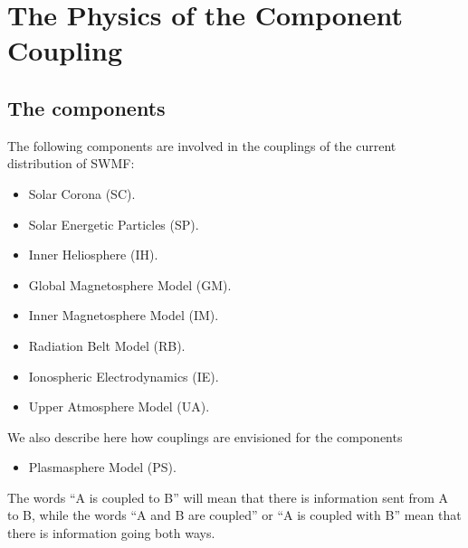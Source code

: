 %

\chapter{The Physics of the Component Coupling}

\section{The components}

The following components are involved in the couplings
of the current distribution of SWMF:
\begin{itemize}

\item Solar Corona (SC).

\item Solar Energetic Particles (SP).

\item Inner Heliosphere (IH).

\item Global Magnetosphere Model (GM).

\item Inner Magnetosphere Model (IM).

\item Radiation Belt Model (RB).

\item Ionospheric Electrodynamics (IE).

\item Upper Atmosphere Model (UA).

\end{itemize}
We also describe here how couplings are envisioned for
the components
\begin{itemize}

\item Plasmasphere Model (PS).

\end{itemize}
The words ``A is coupled to B'' will mean that there is
information sent from A to B, while the words ``A and B are
coupled'' or ``A is coupled with B'' mean 
that there is information going both ways.

